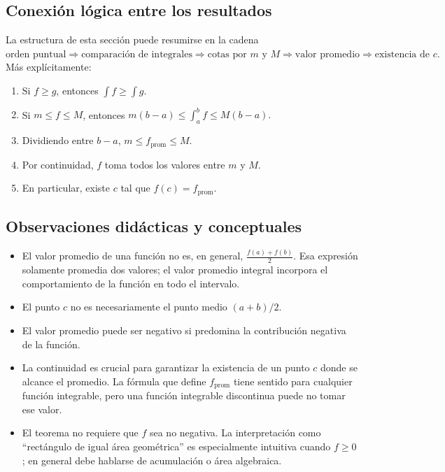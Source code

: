 \documentclass[12pt]{article}
\begin{document}
\subsection*{Conexión lógica entre los resultados}
La estructura de esta sección puede resumirse en la cadena
$
\boxed{
\text{orden puntual}
\Longrightarrow
\text{comparación de integrales}
\Longrightarrow
\text{cotas por }m\text{ y }M
\Longrightarrow
\text{valor promedio}
\Longrightarrow
\text{existencia de }c.
}
$
Más explícitamente:
\begin{enumerate}[label=\arabic*.]
\item Si $f\ge g$, entonces $\int f\ge\int g$.
\item Si $m\le f\le M$, entonces
$
m(b-a)\le\int_a^b f\le M(b-a).
$
\item Dividiendo entre $b-a$,
$
m\le f_{\mathrm{prom}}\le M.
$
\item Por continuidad, $f$ toma todos los valores entre $m$ y $M$.
\item En particular, existe $c$ tal que $f(c)=f_{\mathrm{prom}}$.
\end{enumerate}
\subsection*{Observaciones didácticas y conceptuales}
\begin{itemize}
\item El valor promedio de una función no es, en general,
$
\frac{f(a)+f(b)}{2}.
$
Esa expresión solamente promedia dos valores; el valor promedio integral
incorpora el comportamiento de la función en todo el intervalo.

\item El punto $c$ no es necesariamente el punto medio $(a+b)/2$.

\item El valor promedio puede ser negativo si predomina la contribución
negativa de la función.

\item La continuidad es crucial para garantizar la existencia de un punto
$c$ donde se alcance el promedio. La fórmula que define $f_{\mathrm{prom}}$
tiene sentido para cualquier función integrable, pero una función integrable
discontinua puede no tomar ese valor.

\item El teorema no requiere que $f$ sea no negativa. La interpretación como
``rectángulo de igual área geométrica'' es especialmente intuitiva cuando
$f\ge0$; en general debe hablarse de acumulación o área algebraica.
\end{itemize}
\end{document}
